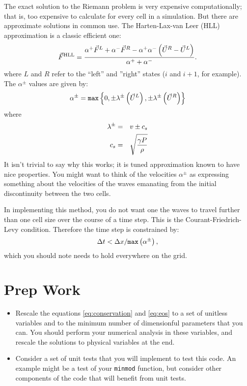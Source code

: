 \documentclass[11pt, preprint]{aastex}
\begin{document}
The exact solution to the Riemann problem is very expensive
computationally; that is, too expensive to calculate for every cell in
a simulation. But there are approximate solutions in common use. The
Harten-Lax-van Leer (HLL) approximation is a classic efficient one:
\begin{equation}
\vec{F}^{\rm HLL} = \frac{\alpha^{+}\vec{F}^L + \alpha^{-} \vec{F}^R -
  \alpha^{+} \alpha^{-} \left(\vec{U}^R - \vec{U}^L\right)}{\alpha^{+}
  + \alpha^{-}}.
\end{equation}
where $L$ and $R$ refer to the ``left'' and ''right'' states ($i$ and
$i+1$, for example). The $\alpha^\pm$ values are given by:
\begin{equation}
  \alpha^\pm = {\tt max}\left\{0,
  \pm \lambda^{\pm}\left(\vec{U}^L\right),
  \pm \lambda^{\pm}\left(\vec{U}^R\right)\right\}
\end{equation}
where
\begin{eqnarray}
  \lambda^{\pm} &=& v\pm c_s \cr
  c_s &=& \sqrt{\frac{\gamma P}{\rho}}
\end{eqnarray}
It isn't trivial to say why this works; it is tuned approximation
known to have nice properties. You might want to think of the
velocities $\alpha^\pm$ as expressing something about the velocities
of the waves emanating from the initial discontinuity between the two
cells.

In implementing this method, you do not want one the waves to travel
further than one cell size over the course of a time step. This is the
Courant-Friedrich-Levy condition. Therefore the time step is
constrained by:
\begin{equation}
\Delta t < \Delta x / {\tt max}\left(\alpha^\pm\right),
\end{equation}
which you should note needs to hold everywhere on the grid.

\section{Prep Work}

\begin{itemize}
\item Rescale the equations \ref{eq:conservation} and \ref{eq:eos} to
  a set of unitless variables and to the minimum number of
  dimensionful parameters that you can. You should perform your
  numerical analysis in these variables, and rescale the solutions to
  physical variables at the end.
\item Consider a set of unit tests that you will implement to test
  this code. An example might be a test of your {\tt minmod} function,
  but consider other components of the code that will benefit from
  unit tests.
\end{itemize}
\end{document}
